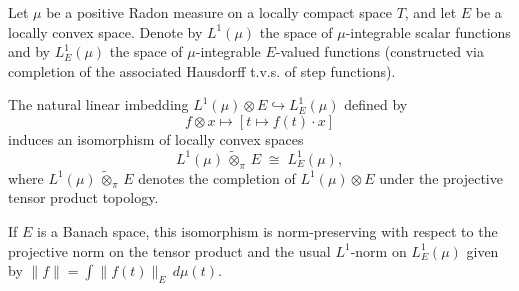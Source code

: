 Let $\mu$ be a positive Radon measure on a locally compact space $T$, and let $E$ be a locally convex space. Denote by $L^1(\mu)$ the space of $\mu$-integrable scalar functions and by $L^1_E(\mu)$ the space of $\mu$-integrable $E$-valued functions (constructed via completion of the associated Hausdorff t.v.s. of step functions).

The natural linear imbedding $L^1(\mu) \otimes E \hookrightarrow L^1_E(\mu)$ defined by
$$f \otimes x \mapsto [t \mapsto f(t) \cdot x]$$
induces an isomorphism of locally convex spaces
$$L^1(\mu) \,\tilde{\otimes}_\pi\, E \;\cong\; L^1_E(\mu),$$
where $L^1(\mu) \,\tilde{\otimes}_\pi\, E$ denotes the completion of $L^1(\mu) \otimes E$ under the projective tensor product topology.

If $E$ is a Banach space, this isomorphism is norm-preserving with respect to the projective norm on the tensor product and the usual $L^1$-norm on $L^1_E(\mu)$ given by $\|f\| = \int \|f(t)\|_E \, d\mu(t)$.
